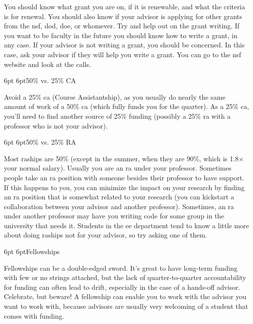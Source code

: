 \documentclass[10pt]{book}
\makeatletter
\renewcommand{\subsection}{\@startsection{subsection}{2}{0mm}%
   {6pt}%
   {6pt}{\normalfont\normalsize\itshape}}
\makeatother
\begin{document}
You should know what grant you are on, if it is renewable, and what the
criteria is for renewal. You should also know if your advisor is applying for
other grants from the {\sc nsf}, {\sc dod}, {\sc doe}, or whomever. Try and
help out on the grant writing. If you want to be faculty in the future you
should know how to write a grant, in any case. If your advisor is not writing a
grant, you should be concerned. In this case, ask your advisor if they will
help you write a grant.  You can go to the {\sc nsf} website and look at the calls.

\subsection{50\% vs. 25\% CA}

Avoid a 25\% {\sc ca} (Course Assistantship), as you usually do
nearly the same amount of work of a 50\% {\sc ca} (which fully funds you for
the quarter). As a 25\% {\sc ca}, you'll need to find another source of 25\%
funding (possibly a 25\% {\sc ra} with a professor who is not your advisor).

\subsection{50\% vs. 25\% RA}

Most {\sc ra}ships are 50\% (except in the summer, when they are 90\%, which is
1.8$\times$ your normal salary). Usually you are an {\sc ra} under your
professor. Sometimes people take an {\sc ra} position with someone besides their
professor to have support.  If this happens to you, you can minimize the impact
on your research by finding an {\sc ra} position that is somewhat related to
your research (you can kickstart a collaboration between your advisor and another professor).
Sometimes, an {\sc ra} under another professor may have you writing code for some group 
in the university that needs it.
Students in the {\sc ee} department tend to know a little more about doing
{\sc ra}ships not for your advisor, so try asking one of them.

\subsection{Fellowships}

Fellowships can be a double-edged sword. It's great to have long-term funding
with few or no strings attached, but the lack of quarter-to-quarter
accountability for funding can often lead to drift, especially in the case of a
hands-off advisor. Celebrate, but beware! A fellowship can enable you to work
with the advisor you want to work with, because advisors are usually very
welcoming of a student that comes with funding.
\end{document}
